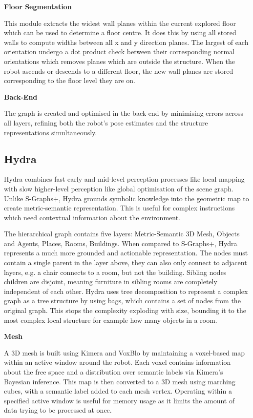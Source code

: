 \noindent \textbf{Floor Segmentation}

This module extracts the widest wall planes within the current explored floor which can be used to determine a floor centre. It does this by using all stored walls to compute widths between all x and y direction planes. The largest of each orientation undergo a dot product check between their corresponding normal orientations which removes planes which are outside the structure. When the robot ascends or descends to a different floor, the new wall planes are stored corresponding to the floor level they are on.

\noindent \textbf{Back-End}

The graph is created and optimised in the back-end by minimising errors across all layers, refining both the robot’s pose estimates and the structure representations simultaneously.


\subsection{Hydra\cite{hydra}}\label{subsec:hydra}
Hydra combines fast early and mid-level perception processes like local mapping with slow higher-level perception like global optimisation of the scene graph. Unlike S-Graphs+, Hydra grounds symbolic knowledge into the geometric map to create metric-semantic representation. This is useful for complex instructions which need contextual information about the environment.

The hierarchical graph contains five layers: Metric-Semantic 3D Mesh, Objects and Agents, Places, Rooms, Buildings. When compared to S-Graphs+, Hydra \cite{hydra} represents a much more grounded and actionable representation. The nodes must contain a single parent in the layer above, they can also only connect to adjacent layers, e.g. a chair connects to a room, but not the building. Sibling nodes children are disjoint, meaning furniture in sibling rooms are completely independent of each other. Hydra uses tree decomposition to represent a complex graph as a tree structure by using bags, which contains a set of nodes from the original graph. This stops the complexity exploding with size, bounding it to the most complex local structure for example how many objects in a room.

\noindent \textbf{Mesh}

A 3D mesh is built using Kimera \cite{DBLP:journals/corr/abs-1910-02490} and VoxBlo \cite{DBLP:journals/corr/OleynikovaTFNS16} by maintaining a voxel-based map within an active window around the robot. Each voxel contains information about the free space and a distribution over semantic labels via Kimera’s Bayesian inference. This map is then converted to a 3D mesh using marching cubes, with a semantic label added to each mesh vertex. Operating within a specified active window is useful for memory usage as it limits the amount of data trying to be processed at once.

